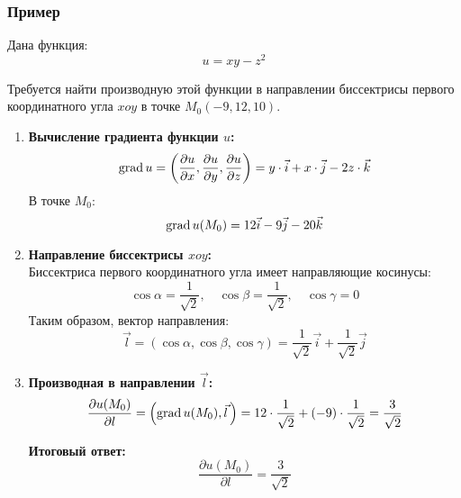 \subsubsection*{Пример}
Дана функция:
\[ u = xy - z^2 \]

Требуется найти производную этой функции в направлении биссектрисы первого координатного угла \( xoy \) в точке \( M_0(-9, 12, 10) \).

\vspace{0.5em}
\begin{enumerate}
	\item \textbf{Вычисление градиента функции \( u \):}
	\[
	\operatorname{grad} u = \left( \frac{\partial u}{\partial x}, \frac{\partial u}{\partial y}, \frac{\partial u}{\partial z} \right) = y \cdot \vec{i} + x \cdot \vec{j} - 2z \cdot \vec{k}
	\]
	В точке \( M_0 \):
	\[
	\operatorname{grad} u(M_0) = 12 \vec{i} - 9 \vec{j} - 20 \vec{k}
	\]
	\item \textbf{Направление биссектрисы \( xoy \):}\\
	Биссектриса первого координатного угла имеет направляющие косинусы:
	\[
	\cos \alpha = \frac{1}{\sqrt{2}}, \quad \cos \beta = \frac{1}{\sqrt{2}}, \quad \cos \gamma = 0
	\]
	Таким образом, вектор направления:
	\[
	\vec{l} = \left(\cos \alpha, \cos \beta, \cos \gamma\right) = \frac{1}{\sqrt{2}} \vec{i} + \frac{1}{\sqrt{2}} \vec{j}
	\]
	\item \textbf{Производная в направлении \( \vec{l} \):}
	\[
	\frac{\partial u(M_0)}{\partial l} = \left( \operatorname{grad} u(M_0), \vec{l} \,\right) = 12 \cdot \frac{1}{\sqrt{2}} + (-9) \cdot \frac{1}{\sqrt{2}} = \frac{3}{\sqrt{2}}
	\]

	\textbf{Итоговый ответ:}
	\[
	\frac{\partial u(M_0)}{\partial l} = \frac{3}{\sqrt{2}}
	\]
\end{enumerate}
